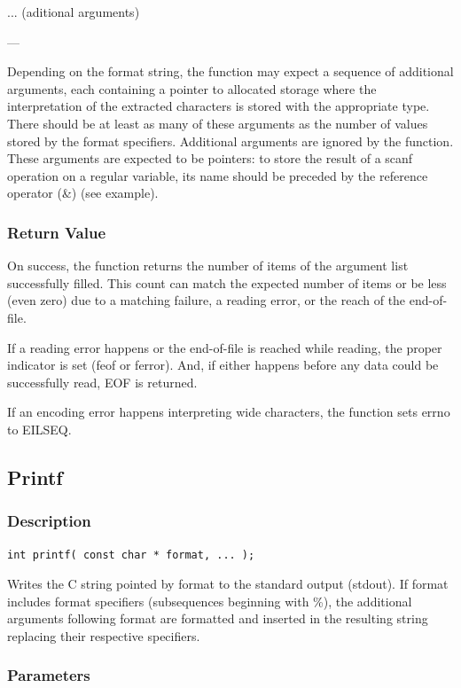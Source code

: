 \documentclass[10pt]{article}
\begin{document}
... (aditional arguments)

---

Depending on the format string, the function may expect a sequence of additional
arguments, each containing a pointer to allocated storage where the
interpretation of the extracted characters is stored with the appropriate type.
There should be at least as many of these arguments as the number of values
stored by the format specifiers. Additional arguments are ignored by the
function. These arguments are expected to be pointers: to store the result of a
scanf operation on a regular variable, its name should be preceded by the
reference operator (\&) (see example).

\subsubsection{Return Value}

On success, the function returns the number of items of the argument list
successfully filled. This count can match the expected number of items or be
less (even zero) due to a matching failure, a reading error, or the reach of the
end-of-file.

If a reading error happens or the end-of-file is reached while reading, the
proper indicator is set (feof or ferror). And, if either happens before any data
could be successfully read, EOF is returned.

If an encoding error happens interpreting wide characters, the function sets
errno to EILSEQ.

\subsection{Printf}

\subsubsection{Description}

\begin{lstlisting}
int printf( const char * format, ... );
\end{lstlisting}

Writes the C string pointed by format to the standard output (stdout). If format
includes format specifiers (subsequences beginning with \%), the additional
arguments following format are formatted and inserted in the resulting string
replacing their respective specifiers.

\subsubsection{Parameters}
\end{document}
